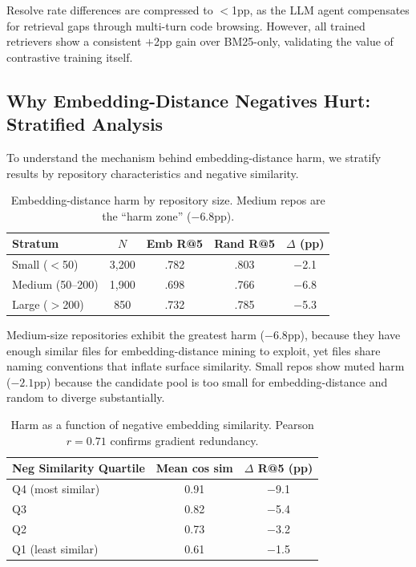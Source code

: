 \documentclass[11pt,a4paper]{article}
\begin{document}
Resolve rate differences are compressed to $<$1pp, as the LLM agent compensates for retrieval gaps through multi-turn code browsing.
However, all trained retrievers show a consistent $+$2pp gain over BM25-only, validating the value of contrastive training itself.

\subsection{Why Embedding-Distance Negatives Hurt: Stratified Analysis}
\label{sec:stratified}

To understand the mechanism behind embedding-distance harm, we stratify results by repository characteristics and negative similarity.

\begin{table}[t]
\centering
\small
\begin{tabular}{lcccc}
\toprule
\textbf{Stratum} & \textbf{$N$} & \textbf{Emb R@5} & \textbf{Rand R@5} & \textbf{$\Delta$ (pp)} \\
\midrule
Small ($<$50) & 3,200 & .782 & .803 & $-$2.1 \\
Medium (50--200) & 1,900 & .698 & .766 & $-$6.8 \\
Large ($>$200) & 850 & .732 & .785 & $-$5.3 \\
\bottomrule
\end{tabular}
\caption{Embedding-distance harm by repository size. Medium repos are the ``harm zone'' ($-6.8$pp).}
\label{tab:harm-strata}
\end{table}

Medium-size repositories exhibit the greatest harm ($-6.8$pp), because they have enough similar files for embedding-distance mining to exploit, yet files share naming conventions that inflate surface similarity.
Small repos show muted harm ($-2.1$pp) because the candidate pool is too small for embedding-distance and random to diverge substantially.

\begin{table}[t]
\centering
\small
\begin{tabular}{lcc}
\toprule
\textbf{Neg Similarity Quartile} & \textbf{Mean cos sim} & \textbf{$\Delta$ R@5 (pp)} \\
\midrule
Q4 (most similar) & 0.91 & $-$9.1 \\
Q3 & 0.82 & $-$5.4 \\
Q2 & 0.73 & $-$3.2 \\
Q1 (least similar) & 0.61 & $-$1.5 \\
\bottomrule
\end{tabular}
\caption{Harm as a function of negative embedding similarity. Pearson $r{=}0.71$ confirms gradient redundancy.}
\label{tab:harm-similarity}
\end{table}
\end{document}
